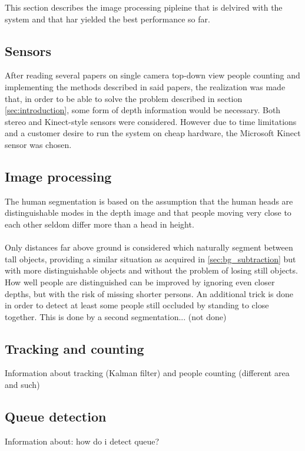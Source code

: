 This section describes the image processing pipleine that is delvired with the system and that har yielded the best performance so far.

\subsection{Sensors}
After reading several papers on single camera top-down view people counting and implementing the methods described in said papers, the realization was made that, in order to be able to solve the problem described in section \ref{sec:introduction}, some form of depth information would be necessary. Both stereo and Kinect-style sensors were considered. However due to time limitations and a customer desire to run the system on cheap hardware, the Microsoft Kinect sensor was chosen.

\subsection{Image processing}
The human segmentation is based on the assumption that the human heads are distinguishable modes in the depth image and that people moving very close to each other seldom differ more than a head in height.\\
\\
Only distances far above ground is considered which naturally segment between tall objects, providing a similar situation as acquired in \ref{sec:bg_subtraction} but with more distinguishable objects and without the problem of losing still objects. How well people are distinguished can be improved by ignoring even closer depths, but with the risk of missing shorter persons. An additional trick is done in order to detect at least some people still occluded by standing to close together. This is done by a second segmentation... (not done)

\subsection{Tracking and counting}
Information about tracking (Kalman filter) and people counting (different area and such)

\subsection{Queue detection}
Information about: how do i detect queue?

